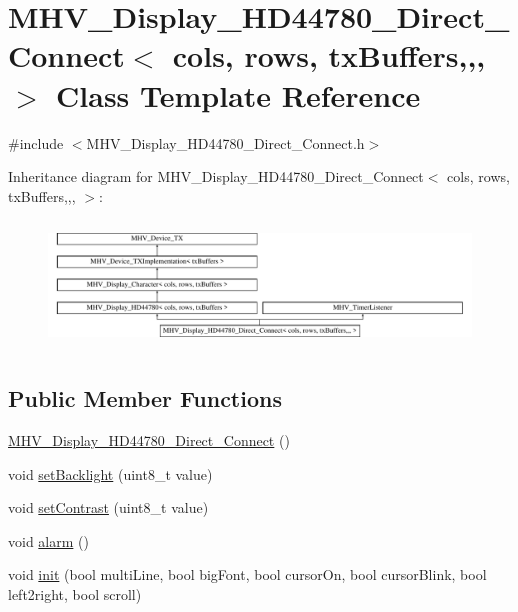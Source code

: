 \hypertarget{class_m_h_v___display___h_d44780___direct___connect}{\section{M\-H\-V\-\_\-\-Display\-\_\-\-H\-D44780\-\_\-\-Direct\-\_\-\-Connect$<$ cols, rows, tx\-Buffers,,, $>$ Class Template Reference}
\label{class_m_h_v___display___h_d44780___direct___connect}
}


{\ttfamily \#include $<$M\-H\-V\-\_\-\-Display\-\_\-\-H\-D44780\-\_\-\-Direct\-\_\-\-Connect.\-h$>$}

Inheritance diagram for M\-H\-V\-\_\-\-Display\-\_\-\-H\-D44780\-\_\-\-Direct\-\_\-\-Connect$<$ cols, rows, tx\-Buffers,,, $>$\-:\begin{figure}[H]
\begin{center}
\leavevmode
\includegraphics[height=3.439803cm]{class_m_h_v___display___h_d44780___direct___connect}
\end{center}
\end{figure}
\subsection*{Public Member Functions}
\begin{DoxyCompactItemize}
\item 
\hyperlink{class_m_h_v___display___h_d44780___direct___connect_ab178284ce0bb6ceaa3691727d88e431d}{M\-H\-V\-\_\-\-Display\-\_\-\-H\-D44780\-\_\-\-Direct\-\_\-\-Connect} ()
\item 
void \hyperlink{class_m_h_v___display___h_d44780___direct___connect_aa33b81ee3cbeb2d792f24357204d8e10}{set\-Backlight} (uint8\-\_\-t value)
\item 
void \hyperlink{class_m_h_v___display___h_d44780___direct___connect_a78469d3274c79bee769718cfef157257}{set\-Contrast} (uint8\-\_\-t value)
\item 
void \hyperlink{class_m_h_v___display___h_d44780___direct___connect_a3f4f05f3f35d1605b858c6f0dfb17e9d}{alarm} ()
\item 
void \hyperlink{class_m_h_v___display___h_d44780___direct___connect_a8d8428f76033aaebe88e455050c9349c}{init} (bool multi\-Line, bool big\-Font, bool cursor\-On, bool cursor\-Blink, bool left2right, bool scroll)
\end{DoxyCompactItemize}
